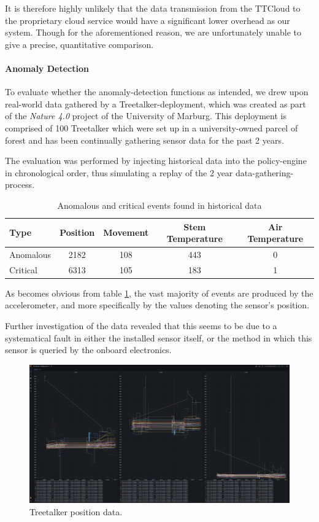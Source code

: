 It is therefore highly unlikely that the data transmission from the TTCloud to the proprietary cloud service would have a significant lower overhead as our system.
Though for the aforementioned reason, we are unfortunately unable to give a precise, quantitative comparison.

\paragraph{Anomaly Detection}

To evaluate whether the anomaly-detection functions as intended, we drew upon real-world data gathered by a Treetalker-deployment, which was created as part of the \textit{Nature 4.0} project of the University of Marburg.
This deployment is comprised of 100 Treetalker which were set up in a university-owned parcel of forest and has been continually gathering sensor data for the past 2 years.

The evaluation was performed by injecting historical data into the policy-engine in chronological order, thus simulating a replay of the 2 year data-gathering-process.

\begin{table}
    \centering
    \begin{tabular}{l | c | c | c | c}
         Type & Position & Movement & Stem Temperature & Air Temperature  \\ \hline
         Anomalous & 2182 & 108 & 443 & 0 \\
         Critical & 6313 & 105 & 183 & 1
    \end{tabular}
    \caption{Anomalous and critical events found in historical data}
    \label{tab:evaluation:anomalies}
\end{table}

As becomes obvious from table \ref{tab:evaluation:anomalies}, the vast majority of events are produced by the accelerometer, and more specifically by the values denoting the sensor's position.

Further investigation of the data revealed that this seems to be due to a systematical fault in either the installed sensor itself, or the method in which this sensor is queried by the onboard electronics.

\begin{figure}
    \centering
    \includegraphics[width=.8\linewidth]{figures/TTT_position_data.png}
    \caption{Treetalker position data.}
    \label{fig:evaluation:position-data}
\end{figure}
